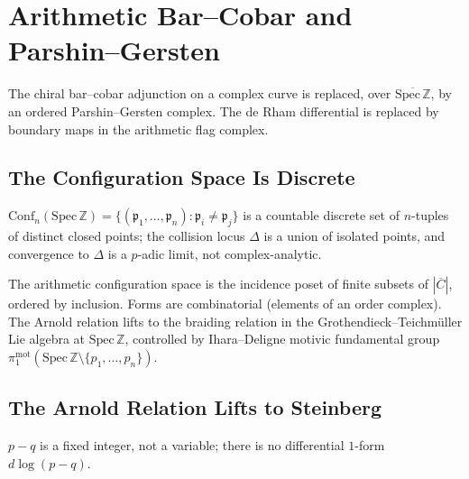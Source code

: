 \chapter{Arithmetic Bar--Cobar and Parshin--Gersten}
\label{v4-arith:arakelov-bar}

The chiral bar--cobar adjunction on a complex curve is replaced, over
\(\overline{\mathrm{Spec}\,\mathbb Z}\), by an ordered
Parshin--Gersten complex. The de Rham differential is replaced by
boundary maps in the arithmetic flag complex.

\section{The Configuration Space Is Discrete}
\label{v4-arith:bar:configuration-space}

\begin{observation}
\label{v4-arith:obs:config-discrete}
\(\mathrm{Conf}_{n}(\mathrm{Spec}\,\mathbb{Z})=\{(\mathfrak{p}_{1},\ldots,\mathfrak{p}_{n})\colon\mathfrak{p}_{i}\neq\mathfrak{p}_{j}\}\)
is a countable discrete set of \(n\)-tuples of distinct closed
points; the collision locus \(\Delta\) is a union of isolated points,
and convergence to \(\Delta\) is a \(p\)-adic limit, not
complex-analytic.
\end{observation}

\begin{definition}
\label{v4-arith:def:arith-config}
The arithmetic configuration space is the incidence poset of
finite subsets of \(|\overline{C}|\), ordered by inclusion. Forms
are combinatorial (elements of an order complex). The Arnold
relation lifts to the braiding relation in the
Grothendieck--Teichm\"uller Lie algebra at
\(\mathrm{Spec}\,\mathbb{Z}\), controlled by Ihara--Deligne motivic
fundamental group
\(\pi_{1}^{\mathrm{mot}}(\mathrm{Spec}\,\mathbb{Z}\setminus\{p_{1},\ldots,p_{n}\})\).
\end{definition}

\section{The Arnold Relation Lifts to Steinberg}
\label{v4-arith:bar:arnold-steinberg}

\begin{observation}[no \(d\log(p-q)\)]
\label{v4-arith:obs:no-dlog-p-q}
\(p-q\) is a fixed integer, not a variable; there is no differential
\(1\)-form \(d\log(p-q)\).
\end{observation}

